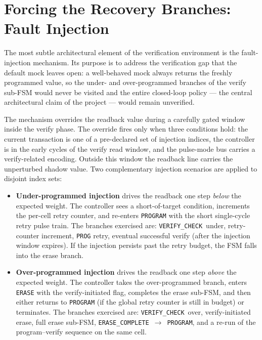 \section{Forcing the Recovery Branches: Fault Injection}
\label{sec:verif-injection}

The most subtle architectural element of the verification environment is
the fault-injection mechanism. Its purpose is to address the verification
gap that the default mock leaves open: a well-behaved mock always returns
the freshly programmed value, so the under- and over-programmed branches
of the verify sub-FSM would never be visited and the entire closed-loop
policy --- the central architectural claim of the project --- would
remain unverified.

The mechanism overrides the readback value during a carefully gated
window inside the verify phase. The override fires only when three
conditions hold: the current transaction is one of a pre-declared set of
injection indices, the controller is in the early cycles of the verify
read window, and the pulse-mode bus carries a verify-related encoding.
Outside this window the readback line carries the unperturbed shadow
value. Two complementary injection scenarios are applied to disjoint
index sets:

\begin{itemize}
    \item \textbf{Under-programmed injection} drives the readback one
          step \emph{below} the expected weight. The controller sees a
          short-of-target condition, increments the per-cell retry
          counter, and re-enters \texttt{PROGRAM} with the short
          single-cycle retry pulse train. The branches exercised are:
          \texttt{VERIFY\_CHECK}~under, retry-counter increment,
          \texttt{PROG} retry, eventual successful verify (after the
          injection window expires). If the injection persists past the
          retry budget, the FSM falls into the erase branch.
    \item \textbf{Over-programmed injection} drives the readback one
          step \emph{above} the expected weight. The controller takes
          the over-programmed branch, enters \texttt{ERASE} with the
          verify-initiated flag, completes the erase sub-FSM, and then
          either returns to \texttt{PROGRAM} (if the global retry
          counter is still in budget) or terminates. The branches
          exercised are: \texttt{VERIFY\_CHECK}~over,
          verify-initiated erase, full erase sub-FSM,
          \texttt{ERASE\_COMPLETE}~$\rightarrow$~\texttt{PROGRAM},
          and a re-run of the program--verify sequence on the same
          cell.
\end{itemize}

